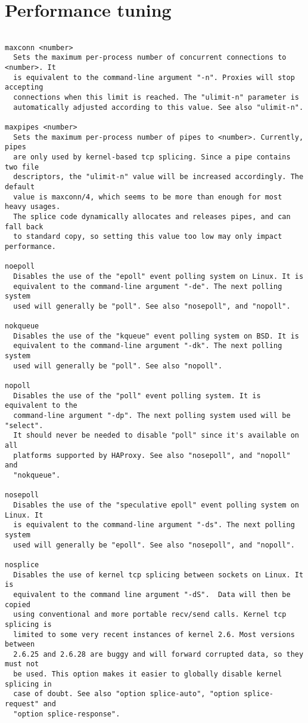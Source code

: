 
\section{Performance tuning}

\begin{verbatim}

maxconn <number>
  Sets the maximum per-process number of concurrent connections to <number>. It
  is equivalent to the command-line argument "-n". Proxies will stop accepting
  connections when this limit is reached. The "ulimit-n" parameter is
  automatically adjusted according to this value. See also "ulimit-n".

maxpipes <number>
  Sets the maximum per-process number of pipes to <number>. Currently, pipes
  are only used by kernel-based tcp splicing. Since a pipe contains two file
  descriptors, the "ulimit-n" value will be increased accordingly. The default
  value is maxconn/4, which seems to be more than enough for most heavy usages.
  The splice code dynamically allocates and releases pipes, and can fall back
  to standard copy, so setting this value too low may only impact performance.

noepoll
  Disables the use of the "epoll" event polling system on Linux. It is
  equivalent to the command-line argument "-de". The next polling system
  used will generally be "poll". See also "nosepoll", and "nopoll".

nokqueue
  Disables the use of the "kqueue" event polling system on BSD. It is
  equivalent to the command-line argument "-dk". The next polling system
  used will generally be "poll". See also "nopoll".

nopoll
  Disables the use of the "poll" event polling system. It is equivalent to the
  command-line argument "-dp". The next polling system used will be "select".
  It should never be needed to disable "poll" since it's available on all
  platforms supported by HAProxy. See also "nosepoll", and "nopoll" and
  "nokqueue".

nosepoll
  Disables the use of the "speculative epoll" event polling system on Linux. It
  is equivalent to the command-line argument "-ds". The next polling system
  used will generally be "epoll". See also "nosepoll", and "nopoll".

nosplice
  Disables the use of kernel tcp splicing between sockets on Linux. It is
  equivalent to the command line argument "-dS".  Data will then be copied
  using conventional and more portable recv/send calls. Kernel tcp splicing is
  limited to some very recent instances of kernel 2.6. Most versions between
  2.6.25 and 2.6.28 are buggy and will forward corrupted data, so they must not
  be used. This option makes it easier to globally disable kernel splicing in
  case of doubt. See also "option splice-auto", "option splice-request" and
  "option splice-response".


\end{verbatim}
